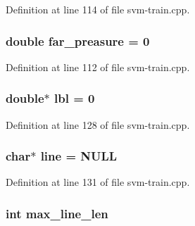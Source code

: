 Definition at line 114 of file svm-\/train.\-cpp.

\hypertarget{svm-train_8cpp_a57ce01656059264c677404c310f3a04e}{
\subsubsection[{far\-\_\-preasure}]{\setlength{\rightskip}{0pt plus 5cm}double far\-\_\-preasure = 0}}\label{svm-train_8cpp_a57ce01656059264c677404c310f3a04e}


Definition at line 112 of file svm-\/train.\-cpp.

\hypertarget{svm-train_8cpp_a537df30cd5b5b576ee32aeffd22affe2}{
\subsubsection[{lbl}]{\setlength{\rightskip}{0pt plus 5cm}double$\ast$ lbl = 0}}\label{svm-train_8cpp_a537df30cd5b5b576ee32aeffd22affe2}


Definition at line 128 of file svm-\/train.\-cpp.

\hypertarget{svm-train_8cpp_a8adb30f4f6669f927fd9232f686c637b}{
\subsubsection[{line}]{\setlength{\rightskip}{0pt plus 5cm}char$\ast$ line = N\-U\-L\-L\hspace{0.3cm}{\ttfamily [static]}}}\label{svm-train_8cpp_a8adb30f4f6669f927fd9232f686c637b}


Definition at line 131 of file svm-\/train.\-cpp.

\hypertarget{svm-train_8cpp_acad24c15bee67d2026f56bc94a1188c7}{
\subsubsection[{max\-\_\-line\-\_\-len}]{\setlength{\rightskip}{0pt plus 5cm}int max\-\_\-line\-\_\-len\hspace{0.3cm}{\ttfamily [static]}}}\label{svm-train_8cpp_acad24c15bee67d2026f56bc94a1188c7}


